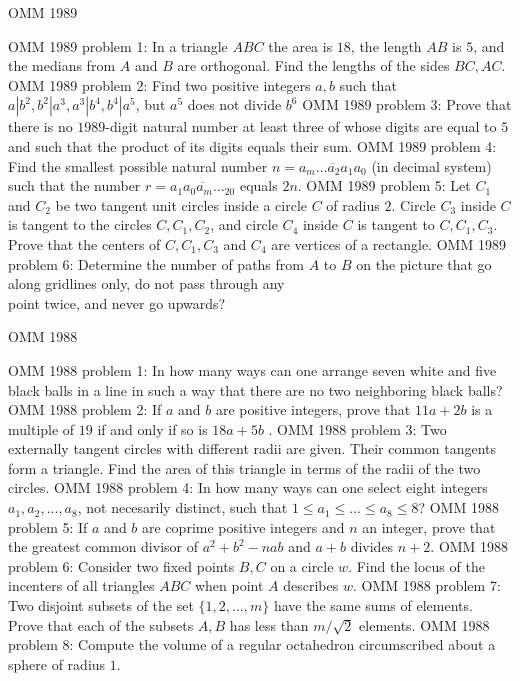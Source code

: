 OMM 1989 

OMM 1989 problem 1:  In a triangle $ABC$ the area is $18$, the length $AB$ is $5$, and the medians from $A$ and $B$ are orthogonal. Find the lengths of the sides $BC,AC$. 
OMM 1989 problem 2:  Find two positive integers $a,b$ such that $a | b^2, b^2 | a^3, a^3 | b^4, b^4 | a^5$, but $a^5$  does not divide $b^6$ 
OMM 1989 problem 3:  Prove that there is no $1989$-digit natural number at least three of whose digits are equal to $5$ and such that the product of its digits equals their sum. 
OMM 1989 problem 4:  Find the smallest possible natural number $n = \overline{a_m ...a_2a_1a_0} $ (in decimal system) such that the number $r =  \overline{a_1a_0a_m ..._20} $ equals $2n$. 
OMM 1989 problem 5:  Let $C_1$ and $C_2$ be two tangent unit circles inside a circle $C$ of radius $2$. Circle $C_3$ inside $C$ is tangent to the circles $C,C_1,C_2$, and circle $C_4$ inside $C$ is tangent to $C,C_1,C_3$. Prove that the centers of $C,C_1,C_3$ and $C_4$ are vertices of a rectangle. 
OMM 1989 problem 6:  Determine the number of paths from $A$ to $B$ on the picture that go along gridlines only, do not pass through any \\
point twice, and never go upwards? 

OMM 1988 

OMM 1988 problem 1:  In how many ways can one arrange seven white and five black balls in a line in such a way that there are no two neighboring black balls? 
OMM 1988 problem 2:  If $a$ and $b$ are positive integers, prove that $11a+2b$ is a multiple of $19$ if and only if so is $18a+5b$ . 
OMM 1988 problem 3:  Two externally tangent circles with different radii are given. Their common tangents form a triangle. Find the area of this triangle in terms of the radii of the two circles. 
OMM 1988 problem 4:  In how many ways can one select eight integers $a_1,a_2, ... ,a_8$, not necesarily distinct, such that $1 \le  a_1 \le ... \le a_8 \le 8$? 
OMM 1988 problem 5:  If $a$ and $b$ are coprime positive integers and $n$ an integer, prove that the greatest common divisor of $a^2+b^2-nab$ and $a+b$ divides $n+2$. 
OMM 1988 problem 6:  Consider two fixed points $B,C$ on a circle $w$. Find the locus of the incenters of all triangles $ABC$ when point $A$ describes $w$. 
OMM 1988 problem 7:  Two disjoint subsets of the set $\{1,2, ... ,m\}$ have the same sums of elements. Prove that each of the subsets $A,B$ has less than $m / \sqrt2$ elements. 
OMM 1988 problem 8:  Compute the volume of a regular octahedron circumscribed about a sphere of radius $1$. 

